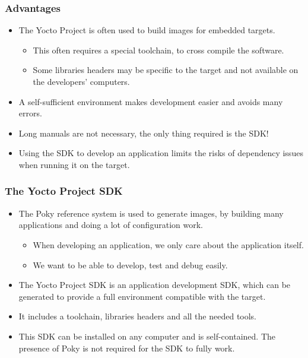 \begin{frame}
  \frametitle{Advantages}
  \begin{itemize}
    \item The Yocto Project is often used to build images for embedded
      targets.
      \begin{itemize}
        \item This often requires a special toolchain, to cross
          compile the software.
        \item Some libraries headers may be specific to the target
          and not available on the developers' computers.
      \end{itemize}
    \item A self-sufficient environment makes development easier and
      avoids many errors.
    \item Long manuals are not necessary, the only thing required is
      the SDK!
    \item Using the SDK to develop an application limits the risks of
      dependency issues when running it on the target.
  \end{itemize}
\end{frame}

\begin{frame}
  \frametitle{The Yocto Project SDK}
  \begin{itemize}
    \item The Poky reference system is used to generate images, by
      building many applications and doing a lot of configuration work.
      \begin{itemize}
        \item When developing an application, we only care about the
          application itself.
        \item We want to be able to develop, test and debug easily.
      \end{itemize}
    \item The Yocto Project SDK is an application development SDK,
      which can be generated to provide a full environment compatible
      with the target.
    \item It includes a toolchain, libraries headers and all the
      needed tools.
    \item This SDK can be installed on any computer and is
      self-contained. The presence of Poky is not required for the SDK
      to fully work.
  \end{itemize}
\end{frame}

